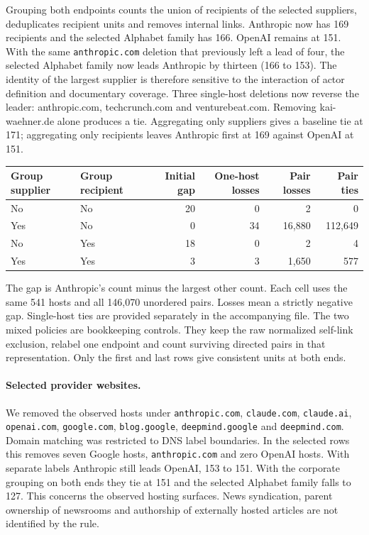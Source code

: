 Grouping both endpoints counts the union of recipients of the selected suppliers, deduplicates recipient units and removes internal links. Anthropic now has 169 recipients and the selected Alphabet family has 166. OpenAI remains at 151. With the same \texttt{anthropic.com} deletion that previously left a lead of four, the selected Alphabet family now leads Anthropic by thirteen (166 to 153). The identity of the largest supplier is therefore sensitive to the interaction of actor definition and documentary coverage. Three single-host deletions now reverse the leader: anthropic.com, techcrunch.com and venturebeat.com. Removing kai-waehner.de alone produces a tie. Aggregating only suppliers gives a baseline tie at 171; aggregating only recipients leaves Anthropic first at 169 against OpenAI at 151.

\begin{center}\small
\begin{tabular}{llrrrr}
\toprule
Group supplier & Group recipient & Initial gap & One-host losses & Pair losses & Pair ties\\
\midrule
No & No & 20 & 0 & 2 & 0 \\
Yes & No & 0 & 34 & 16,880 & 112,649 \\
No & Yes & 18 & 0 & 2 & 4 \\
Yes & Yes & 3 & 3 & 1,650 & 577 \\
\bottomrule
\end{tabular}
\end{center}
The gap is Anthropic's count minus the largest other count. Each cell uses the same 541 hosts and all 146,070 unordered pairs. Losses mean a strictly negative gap. Single-host ties are provided separately in the accompanying file. The two mixed policies are bookkeeping controls. They keep the raw normalized self-link exclusion, relabel one endpoint and count surviving directed pairs in that representation. Only the first and last rows give consistent units at both ends.

\paragraph{Selected provider websites.}
We removed the observed hosts under \texttt{anthropic.com}, \texttt{claude.com}, \texttt{claude.ai}, \texttt{openai.com}, \texttt{google.com}, \texttt{blog.google}, \texttt{deepmind.google} and \texttt{deepmind.com}. Domain matching was restricted to DNS label boundaries. In the selected rows this removes seven Google hosts, \texttt{anthropic.com} and zero OpenAI hosts. With separate labels Anthropic still leads OpenAI, 153 to 151. With the corporate grouping on both ends they tie at 151 and the selected Alphabet family falls to 127. This concerns the observed hosting surfaces. News syndication, parent ownership of newsrooms and authorship of externally hosted articles are not identified by the rule.

